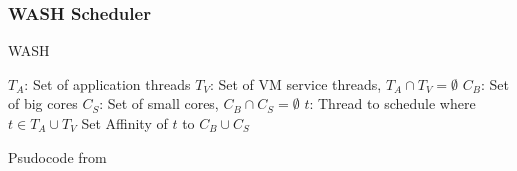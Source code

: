 \documentclass{beamer}
\begin{document}
	\begin{frame}
		\frametitle{WASH Scheduler}
		\vspace*{-2.5mm}
		\begin{algorithm}[H]
		\caption{WASH}\label{euclid}
		\begin{algorithmic}
				\State $T_A$: Set of application threads
				\State $T_V$: Set of VM service threads, $T_A \cap T_V = \emptyset$
				\State $C_B$: Set of big cores
				\State $C_S$: Set of small cores, $C_B \cap C_S = \emptyset$
				\State $t$: Thread to schedule where $t \in T_A \cup T_V$
					\EndIf
						\State Set Affinity of $t$ to $C_B \cup C_S$
					\EndIf
				\EndIf
			\EndFunction
		\end{algorithmic}
		\end{algorithm}
		\vspace*{-7mm}
		Psudocode from \cite{Jibaja:2016:PPA:2854038.2854047}
	\end{frame}
	
	\begin{frame}
		
		{}
	\end{frame}
\end{document}
